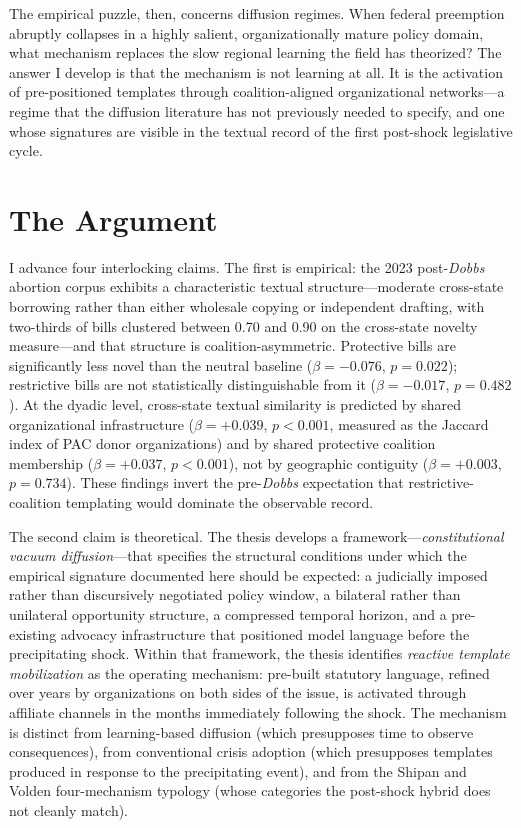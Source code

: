The empirical puzzle, then, concerns diffusion regimes. When federal preemption abruptly collapses in a highly salient, organizationally mature policy domain, what mechanism replaces the slow regional learning the field has theorized? The answer I develop is that the mechanism is not learning at all. It is the activation of pre-positioned templates through coalition-aligned organizational networks---a regime that the diffusion literature has not previously needed to specify, and one whose signatures are visible in the textual record of the first post-shock legislative cycle.

\section{The Argument}

I advance four interlocking claims. The first is empirical: the 2023 post-\textit{Dobbs} abortion corpus exhibits a characteristic textual structure---moderate cross-state borrowing rather than either wholesale copying or independent drafting, with two-thirds of bills clustered between 0.70 and 0.90 on the cross-state novelty measure---and that structure is coalition-asymmetric. Protective bills are significantly less novel than the neutral baseline ($\beta = -0.076$, $p = 0.022$); restrictive bills are not statistically distinguishable from it ($\beta = -0.017$, $p = 0.482$). At the dyadic level, cross-state textual similarity is predicted by shared organizational infrastructure ($\beta = +0.039$, $p < 0.001$, measured as the Jaccard index of PAC donor organizations) and by shared protective coalition membership ($\beta = +0.037$, $p < 0.001$), not by geographic contiguity ($\beta = +0.003$, $p = 0.734$). These findings invert the pre-\textit{Dobbs} expectation that restrictive-coalition templating would dominate the observable record.

The second claim is theoretical. The thesis develops a framework---\emph{constitutional vacuum diffusion}---that specifies the structural conditions under which the empirical signature documented here should be expected: a judicially imposed rather than discursively negotiated policy window, a bilateral rather than unilateral opportunity structure, a compressed temporal horizon, and a pre-existing advocacy infrastructure that positioned model language before the precipitating shock. Within that framework, the thesis identifies \emph{reactive template mobilization} as the operating mechanism: pre-built statutory language, refined over years by organizations on both sides of the issue, is activated through affiliate channels in the months immediately following the shock. The mechanism is distinct from learning-based diffusion (which presupposes time to observe consequences), from conventional crisis adoption (which presupposes templates produced in response to the precipitating event), and from the Shipan and Volden four-mechanism typology (whose categories the post-shock hybrid does not cleanly match).

